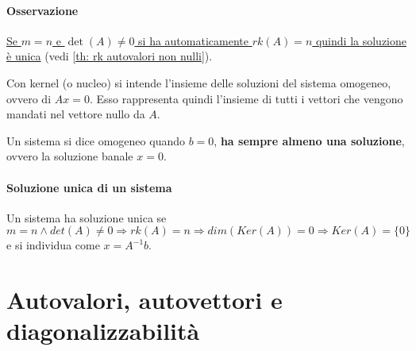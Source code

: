 \documentclass[12pt,a4paper,]{report}
\begin{document}
\paragraph{Osservazione}
\uline{Se $m = n$ e $\det(A) \neq 0$ si ha automaticamente $rk(A) = n$ quindi la soluzione è unica} (vedi \autoref{th: rk autovalori non nulli}).

\begin{definizione}
    [Kernel]
    Con kernel (o nucleo) si intende l'insieme delle soluzioni del sistema omogeneo, ovvero di $Ax=0$.
    Esso rappresenta quindi l'insieme di tutti i vettori che vengono mandati nel vettore nullo da $A$.
\end{definizione}

\begin{definizione}
    Un sistema si dice omogeneo quando $b=0$, \textbf{ha sempre almeno una soluzione}, ovvero la soluzione banale $x=0$.
\end{definizione}
\paragraph{Soluzione unica di un sistema}
Un sistema ha soluzione unica se
\[
m = n \wedge det(A)\neq 0 \Longrightarrow rk(A) = n \Longrightarrow dim(Ker(A)) = 0 \Longrightarrow Ker(A) = \{0\}
\]
e si individua come $x = A^{-1}b$.

\begin{lezione}
    [Lezione 5 11/03]
\end{lezione}

\section{Autovalori, autovettori e diagonalizzabilità}
\end{document}

